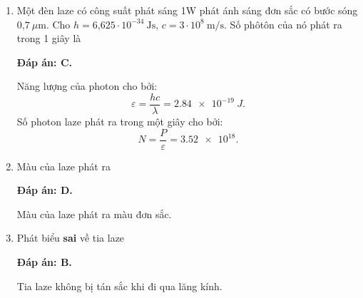\begin{enumerate}[label=\bfseries Câu \arabic*:]
{	}
	
\item {} 
	
	\cauhoi
	{Một đèn laze có công suất phát sáng 1W phát ánh sáng đơn sắc có bước sóng $\text{0,7}\ \mu\text{m}$. Cho $h = \text{6,625}\cdot 10^{-34}\ \text{Js}$, $c = 3\cdot 10^8\ \text{m/s}$. Số phôtôn của nó phát ra trong 1 giây là
	}
	
	\loigiai
	{		\textbf{Đáp án: C.}

Năng lượng của photon cho bởi:
$$
	\varepsilon = \dfrac{hc}{\lambda} = \SI{2,84 e-19}{J}.
$$		
Số photon laze phát ra trong một giây cho bởi:
$$
	N = \dfrac{P}{\varepsilon} = \num{3,52 e18}.
$$
		
	}
	
	\item {} 
	
	\cauhoi
	{Màu của laze phát ra
	}
	
	\loigiai
	{		\textbf{Đáp án: D.}
		
Màu của laze phát ra màu đơn sắc.
		
	}
	
	\item {}
	
	\cauhoi
	{Phát biểu \textbf{sai} về tia laze
	}
	
	\loigiai
	{		\textbf{Đáp án: B.}
		
Tia laze không bị tán sắc khi đi qua lăng kính.
		
	}
		

\end{enumerate}

